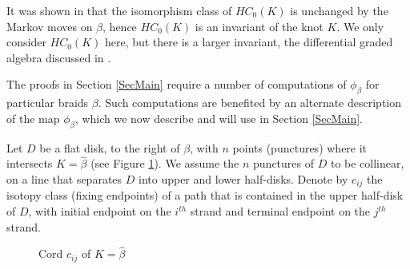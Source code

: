 \documentclass[11pt]{amsart}
\theoremstyle{definition}
\begin{document}
  It was shown in \cite{Ng08} that the isomorphism class of $HC_0(K)$ is unchanged by the Markov moves on $\beta$, hence $HC_0(K)$ is an invariant of the knot $K$. We only consider $HC_0(K)$ here, but there is a larger invariant, the differential graded algebra discussed in \cite{Ng12}.

  The proofs in Section \ref{SecMain} require a number of computations of $\phi_\beta$ for particular braids $\beta$. Such computations are benefited by an alternate description of the map $\phi_\beta$, which we now describe and will use in Section \ref{SecMain}.

  Let $D$ be a flat disk, to the right of $\beta$, with $n$ points (punctures) where it intersects $K=\hat{\beta}$ (see Figure \ref{FigA_nGens}). We assume the $n$ punctures of $D$ to be collinear, on a line that separates $D$ into upper and lower half-disks. Denote by $c_{ij}$ the isotopy class (fixing endpoints) of a path that is contained in the upper half-disk of $D$, with initial endpoint on the $i^{th}$ strand and terminal endpoint on the $j^{th}$ strand.

  \begin{figure}[ht]
\caption{Cord $c_{ij}$ of $K=\hat \beta$}
\label{FigA_nGens}
\end{figure}
\end{document}
